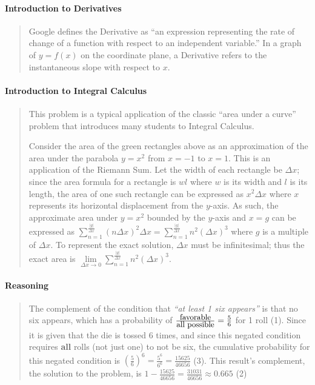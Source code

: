 \documentclass[letterpaper,12pt,twoside]{report}
\begin{document}
	\paragraph{Introduction to Derivatives}
	\begin{quotation}
	Google defines the Derivative as ``an expression representing the rate of change of a function with respect to an independent variable.'' In a graph of $y=f(x)$ on the coordinate plane, a Derivative refers to the instantaneous slope with respect to $x$. 
\end{quotation}

	\paragraph{Introduction to Integral Calculus}
	\begin{quotation}
		This problem is a typical application of the classic ``area under a curve'' problem that introduces many students to Integral Calculus.
		
		Consider the area of the {\color{green} green} rectangles above as an approximation of the area under the parabola $y=x^2$ from $x=-1$ to $x=1$. This is an application of the Riemann Sum. Let the width of each rectangle be $\Delta x$; since the area formula for a rectangle is $wl$ where $w$ is its width and $l$ is its length, the area of one such rectangle can be expressed as $x^2\Delta x$ where $x$ represents its horizontal displacement from the $y$-axis. As such, the approximate area under $y=x^2$ bounded by the $y$-axis and $x=g$ can be expressed as $\sum\limits_{n=1}^{\frac{|g|}{\Delta x}}(n\Delta x)^2\Delta x=\sum\limits_{n=1}^{\frac{|g|}{\Delta x}}n^2(\Delta x)^3$ where $g$ is a multiple of $\Delta x$. To represent the exact solution, $\Delta x$ must be infinitesimal; thus the exact area is $\lim\limits_{\Delta x \rightarrow 0}\sum\limits_{n=1}^{\frac{|g|}{\Delta x}}n^2(\Delta x)^3$.
	\end{quotation}
	
	\paragraph{Reasoning}
	\begin{quotation}
	
	The complement of the condition that \textit{``at least 1 six appears''} is that no six appears, which has a probability of $\frac{\textrm{\small{favorable}}}{\textrm{\small{all possible}}} = \frac{5}{6}$ for 1 roll (1). Since it is given that the die is tossed 6 times, and since this negated condition requires \textbf{all} rolls (not just one) to not be six, the cumulative probability for this negated condition is $(\frac{5}{6})^6 = \frac{5^6}{6^6} = \frac{15625}{46656}$ (3). This result's complement, the solution to the problem, is $1-\frac{15625}{46656} = \boxed{\frac{31031}{46656} \approx 0.665}$ (2) 
	
	\end{quotation}
	
\end{document}
